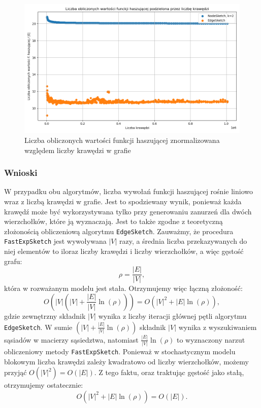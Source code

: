 \begin{figure}[!ht]
    \includegraphics[width=14cm]{img/calculated_hashes_vs_edges_relative.png}
    \centering
    \caption[Liczba operacji znormalizowana]{Liczba obliczonych wartości funkcji haszującej znormalizowana względem liczby krawędzi w grafie}
    \label{fig:calculated_hashes_vs_edges_relative}
\end{figure}

\subsubsection*{Wnioski}
W przypadku obu algorytmów, liczba wywołań funkcji haszującej rośnie liniowo wraz z liczbą krawędzi w grafie. Jest to spodziewany wynik, ponieważ każda krawędź może być wykorzystywana tylko przy generowaniu zanurzeń dla dwóch wierzchołków, które ją wyznaczają. Jest to także zgodne z teoretyczną złożonością obliczeniową algorytmu \texttt{EdgeSketch}. Zauważmy, że procedura \texttt{FastExpSketch} jest wywoływana $|V|$ razy, a średnia liczba przekazywanych do niej elementów to iloraz liczby krawędzi i liczby wierzchołków, a więc gęstość grafu:
\[
    \rho = \frac{|E|}{|V|},
\]
która w rozważanym modelu jest stała. Otrzymujemy więc łączną złożoność:
\[
    O(|V|(|V| + \frac{|E|}{|V|} \ln(\rho))) = O(|V|^2 + |E| \ln(\rho)),
\]
gdzie zewnętrzny składnik $|V|$ wynika z liczby iteracji głównej pętli algorytmu \texttt{EdgeSketch}. W sumie $(|V| + \frac{|E|}{|V|} \ln(\rho))$ składnik $|V|$ wynika z wyszukiwaniem sąsiadów w macierzy sąsiedztwa, natomiast $\frac{|E|}{|V|} \ln(\rho)$ to wyznaczony narzut obliczeniowy metody \texttt{FastExpSketch}. Ponieważ w stochastycznym modelu blokowym liczba krawędzi zależy kwadratowo od liczby wierzchołków, możemy przyjąć $O(|V|^2) = O(|E|)$. Z tego faktu, oraz traktując gęstość jako stałą, otrzymujemy ostatecznie:
\[
    O(|V|^2 + |E| \ln(\rho)) = O(|E|).
\]

